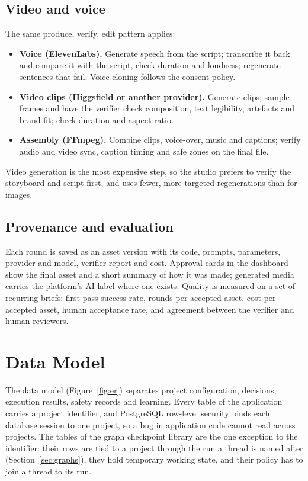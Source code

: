\documentclass[11pt,a4paper]{article}
\begin{document}
\subsection{Video and voice}
The same produce, verify, edit pattern applies:
\begin{itemize}
  \item \textbf{Voice (ElevenLabs).} Generate speech from the script; transcribe it back and compare it with the script, check duration and loudness; regenerate sentences that fail. Voice cloning follows the consent policy.
  \item \textbf{Video clips (Higgsfield or another provider).} Generate clips; sample frames and have the verifier check composition, text legibility, artefacts and brand fit; check duration and aspect ratio.
  \item \textbf{Assembly (FFmpeg).} Combine clips, voice-over, music and captions; verify audio and video sync, caption timing and safe zones on the final file.
\end{itemize}
Video generation is the most expensive step, so the studio prefers to verify the storyboard and script first, and uses fewer, more targeted regenerations than for images.

\subsection{Provenance and evaluation}
Each round is saved as an asset version with its code, prompts, parameters, provider and model, verifier report and cost. Approval cards in the dashboard show the final asset and a short summary of how it was made; generated media carries the platform's AI label where one exists. Quality is measured on a set of recurring briefs: first-pass success rate, rounds per accepted asset, cost per accepted asset, human acceptance rate, and agreement between the verifier and human reviewers.

\section{Data Model}\label{sec:data}

The data model (Figure~\ref{fig:er}) separates project configuration, decisions, execution results, safety records and learning. Every table of the application carries a project identifier, and PostgreSQL row-level security binds each database session to one project, so a bug in application code cannot read across projects. The tables of the graph checkpoint library are the one exception to the identifier: their rows are tied to a project through the run a thread is named after (Section~\ref{sec:graphs}), they hold temporary working state, and their policy has to join a thread to its run.
\end{document}
